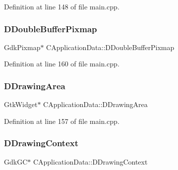 Definition at line 148 of file main.\+cpp.

\hypertarget{classCApplicationData_aefb64ec5ca3f791f6d431cfc56b9f3b3}{}\label{classCApplicationData_aefb64ec5ca3f791f6d431cfc56b9f3b3} 
\subsubsection{\texorpdfstring{D\+Double\+Buffer\+Pixmap}{DDoubleBufferPixmap}}
{\footnotesize\ttfamily Gdk\+Pixmap$\ast$ C\+Application\+Data\+::\+D\+Double\+Buffer\+Pixmap\hspace{0.3cm}{\ttfamily [protected]}}



Definition at line 160 of file main.\+cpp.

\hypertarget{classCApplicationData_a4735f5d31632313e0b2a1659eb178987}{}\label{classCApplicationData_a4735f5d31632313e0b2a1659eb178987} 
\subsubsection{\texorpdfstring{D\+Drawing\+Area}{DDrawingArea}}
{\footnotesize\ttfamily Gtk\+Widget$\ast$ C\+Application\+Data\+::\+D\+Drawing\+Area\hspace{0.3cm}{\ttfamily [protected]}}



Definition at line 157 of file main.\+cpp.

\hypertarget{classCApplicationData_aa6c5bea9bdcc64398e5a3f693661d37c}{}\label{classCApplicationData_aa6c5bea9bdcc64398e5a3f693661d37c} 
\subsubsection{\texorpdfstring{D\+Drawing\+Context}{DDrawingContext}}
{\footnotesize\ttfamily Gdk\+GC$\ast$ C\+Application\+Data\+::\+D\+Drawing\+Context\hspace{0.3cm}{\ttfamily [protected]}}



